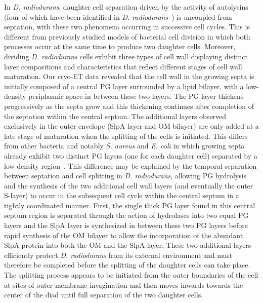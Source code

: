 In \textit{D. radiodurans}, daughter cell separation driven by the activity of autolysins~\cite{vermassenCellWallHydrolases2019} (four of which have been identified in \textit{D. radiodurans}~\cite{santosInterplayMnFe2019}) is uncoupled from septation, with these two phenomena occurring in successive cell cycles.
This is different from previously studied models of bacterial cell division in which both processes occur at the same time to produce two daughter cells.
Moreover, dividing \textit{D. radiodurans} cells exhibit three types of cell wall displaying distinct layer compositions and characteristics that reflect different stages of cell wall maturation.
Our cryo-ET data revealed that the cell wall in the growing septa is initially composed of a central PG layer surrounded by a lipid bilayer, with a low-density periplasmic space in between these two layers.
The PG layer thickens progressively as the septa grow and this thickening continues after completion of the septation within the central septum.
The additional layers observed exclusively in the outer envelope (SlpA layer and OM bilayer) are only added at a late stage of maturation when the splitting of the cells is initiated.
This differs from other bacteria and notably \textit{S. aureus} and \textit{E. coli} in which growing septa already exhibit two distinct PG layers (one for each daughter cell) separated by a low-density region~\cite{navarroCellWallSynthesis2022,matiasCryoelectronMicroscopyCell2007}.
This difference may be explained by the temporal separation between septation and cell splitting in \textit{D. radiodurans}, allowing PG hydrolysis and the synthesis of the two additional cell wall layers (and eventually the outer S-layer) to occur in the subsequent cell cycle within the central septum in a tightly coordinated manner.
First, the single thick PG layer found in this central septum region is separated through the action of hydrolases into two equal PG layers and the SlpA layer is synthesized in between these two PG layers before rapid synthesis of the OM bilayer to allow the incorporation of the abundant SlpA protein into both the OM and the SlpA layer.
These two additional layers efficiently protect \textit{D. radiodurans} from its external environment and must therefore be completed before the splitting of the daughter cells can take place.
The splitting process appears to be initiated from the outer boundaries of the cell at sites of outer membrane invagination and then moves inwards towards the center of the diad until full separation of the two daughter cells.

